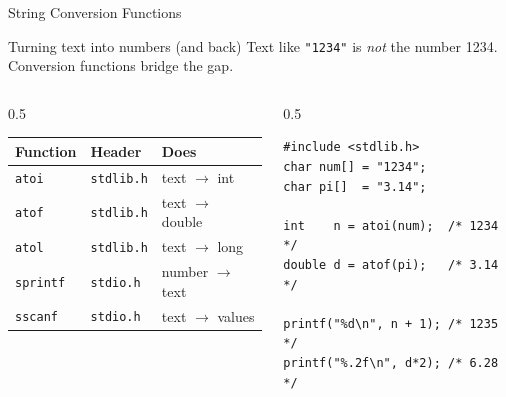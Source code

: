 \documentclass[aspectratio=169]{beamer}
\begin{document}
	\begin{frame}[fragile]{String Conversion Functions}
		\begin{block}{Turning text into numbers (and back)}
			Text like \texttt{"1234"} is \emph{not} the number 1234. Conversion functions bridge the gap.
		\end{block}
		\begin{columns}[T]
			\begin{column}{0.5\textwidth}
				\renewcommand{\arraystretch}{1.25}
				\centering
				\begin{tabular}{@{}lll@{}}
					\toprule
					\textbf{Function} & \textbf{Header} & \textbf{Does} \\
					\midrule
					\texttt{atoi} & \texttt{stdlib.h} & text $\to$ int \\
					\texttt{atof} & \texttt{stdlib.h} & text $\to$ double \\
					\texttt{atol} & \texttt{stdlib.h} & text $\to$ long \\
					\texttt{sprintf} & \texttt{stdio.h} & number $\to$ text \\
					\texttt{sscanf}  & \texttt{stdio.h} & text $\to$ values \\
					\bottomrule
				\end{tabular}
			\end{column}
			\begin{column}{0.5\textwidth}
				\begin{lstlisting}
#include <stdlib.h>
char num[] = "1234";
char pi[]  = "3.14";

int    n = atoi(num);  /* 1234 */
double d = atof(pi);   /* 3.14 */

printf("%d\n", n + 1); /* 1235 */
printf("%.2f\n", d*2); /* 6.28 */
				\end{lstlisting}
			\end{column}
		\end{columns}
	\end{frame}

\end{document}
